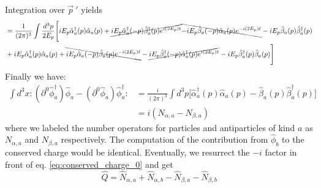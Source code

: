 Integration over $\vec {p}~'$ yields 
\begin{align*}
&= \frac{1}{(2\pi)^3} \int \frac{d^3 p}{2E_p} \Bigg[ iE_p \hat{\alpha}_a^\dagger (p) \hat{\alpha}_a (p) + \cancel{ iE_p \hat{\alpha}_a^\dagger (-p) \hat{\beta}_a^\dagger (p) e^{i(2E_p)t}} \bcancel{- iE_p \hat{\beta}_a (-p) \hat{\alpha}_a (p) e^{-i(2E_p)t}} - iE_p \hat{\beta}_a (p) \hat{\beta}_a^\dagger (p) \\
&+ iE_p \hat{\alpha}_a^\dagger (p) \hat{\alpha}_a (p) +  \bcancel{ iE_p \hat{\alpha}_a (-p) \hat{\beta}_a (p) e^{-i(2E_p)t}} -     \cancel{ iE_p \hat{\beta}_a^\dagger (-p) \hat{\alpha}_a^\dagger (p) e^{i(2E_p)t}}- iE_p \hat{\beta}_a^\dagger (p) \hat{\beta}_a (p) \Bigg]
\end{align*}
Finally we have:
\begin{equation}
\begin{split}
     \int d^3 x:(\partial^0 \hat{\phi}_a^\dagger)\hat{\phi}_a-(\partial^0 \hat{\phi}_a)\hat{\phi}_a^\dagger: & = \frac{i}{(2\pi)^3} \int d^3 p \Bigg[ \hat{\alpha}_a^\dagger (p) \hat{\alpha}_a (p) - \hat{\beta}_a (p) \hat{\beta}_a^\dagger (p)    \Bigg]\\ &=i (N_{\alpha,a}-N_{\beta, a}) 
     \end{split}
\end{equation}
where we labeled the number operators for particles and antiparticles of kind $a$ as $N_{\alpha, a}$ and $N_{\beta, a}$ respectively.
The computation of the contribution from $\hat \phi_b$ to the conserved charge would be identical. 
Eventually, we resurrect the $-i$ factor in front of eq. \eqref{eq:conserved_charge_0} and get
\begin{equation}
    \hat Q = \hat N_{\alpha, a}+ \hat  N_{\alpha, b}
-  \hat N  _{\beta, a}- \hat N_{\beta,b} \end{equation}
